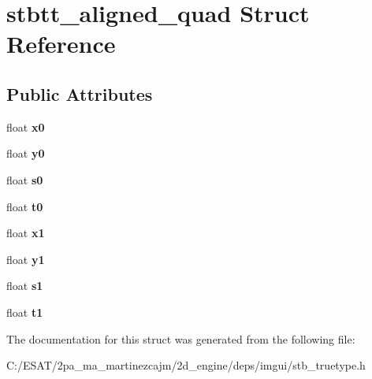 \hypertarget{structstbtt__aligned__quad}{}\section{stbtt\+\_\+aligned\+\_\+quad Struct Reference}
\label{structstbtt__aligned__quad}
\subsection*{Public Attributes}
\begin{DoxyCompactItemize}
\item 
\mbox{\label{structstbtt__aligned__quad_ad74fd8fd69f8a8e1bd20cb0ab7df6e2e}} 
float {\bfseries x0}
\item 
\mbox{\label{structstbtt__aligned__quad_a6178a6b380cf6889893afaeb5019ecd6}} 
float {\bfseries y0}
\item 
\mbox{\label{structstbtt__aligned__quad_ac23b153ff4042deb5499e5a8cacf4a59}} 
float {\bfseries s0}
\item 
\mbox{\label{structstbtt__aligned__quad_a921cd13638a8b3a1e0729021d371da49}} 
float {\bfseries t0}
\item 
\mbox{\label{structstbtt__aligned__quad_a43a7eeac24238e289f825e644331dee6}} 
float {\bfseries x1}
\item 
\mbox{\label{structstbtt__aligned__quad_a66ee8061da982804073a3d2a9114e53c}} 
float {\bfseries y1}
\item 
\mbox{\label{structstbtt__aligned__quad_a26360efee3cdfb5aa2bdc593157b436b}} 
float {\bfseries s1}
\item 
\mbox{\label{structstbtt__aligned__quad_ae1f5ed7333ca5bba46c6a098a05ac75b}} 
float {\bfseries t1}
\end{DoxyCompactItemize}


The documentation for this struct was generated from the following file\+:\begin{DoxyCompactItemize}
\item 
C\+:/\+E\+S\+A\+T/2pa\+\_\+ma\+\_\+martinezcajm/2d\+\_\+engine/deps/imgui/stb\+\_\+truetype.\+h\end{DoxyCompactItemize}
